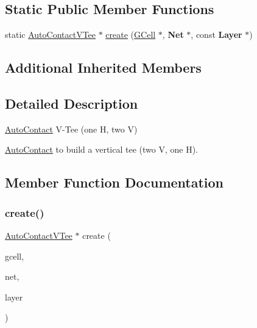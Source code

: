 \subsection*{Static Public Member Functions}
\begin{DoxyCompactItemize}
\item 
static \hyperlink{classKatabatic_1_1AutoContactVTee}{Auto\+Contact\+V\+Tee} $\ast$ \hyperlink{classKatabatic_1_1AutoContactVTee_ab6932aef1faf4881375cc989f5cd9c2c}{create} (\hyperlink{classKatabatic_1_1GCell}{G\+Cell} $\ast$, \textbf{ Net} $\ast$, const \textbf{ Layer} $\ast$)
\end{DoxyCompactItemize}
\subsection*{Additional Inherited Members}


\subsection{Detailed Description}
\hyperlink{classKatabatic_1_1AutoContact}{Auto\+Contact} V-\/\+Tee (one H, two V) 

\hyperlink{classKatabatic_1_1AutoContact}{Auto\+Contact} to build a vertical tee (two V, one H). 

\subsection{Member Function Documentation}
\mbox{\label{classKatabatic_1_1AutoContactVTee_ab6932aef1faf4881375cc989f5cd9c2c}} 
\subsubsection{\texorpdfstring{create()}{create()}}
{\footnotesize\ttfamily \hyperlink{classKatabatic_1_1AutoContactVTee}{Auto\+Contact\+V\+Tee} $\ast$ create (\begin{DoxyParamCaption}\item[{\hyperlink{classKatabatic_1_1GCell}{G\+Cell} $\ast$}]{gcell,  }\item[{\textbf{ Net} $\ast$}]{net,  }\item[{const \textbf{ Layer} $\ast$}]{layer }\end{DoxyParamCaption})\hspace{0.3cm}{\ttfamily [static]}}


